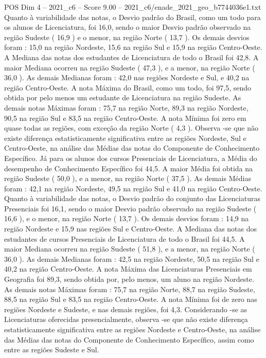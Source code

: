 \begin{textsample}{POS Dim 4 – 2021\_c6 – Score 9.00 – 2021\_c6/enade\_2021\_geo\_b7744036e1.txt}
Quanto à variabilidade das notas, o Desvio padrão do Brasil, como um todo para os alunos de Licenciatura, foi 16,0, sendo o maior Desvio padrão observado na região Sudeste ( 16,9 ) e o menor, na região Norte ( 13,7 ).
Os demais desvios foram : 15,0 na região Nordeste, 15,6 na região Sul e 15,9 na região Centro-Oeste.
A Mediana das notas dos estudantes de Licenciatura de todo o Brasil foi 42,8.
A maior Mediana ocorreu na região Sudeste ( 47,3 ), e a menor, na região Norte ( 36,0 ).
As demais Medianas foram : 42,0 nas regiões Nordeste e Sul, e 40,2 na região Centro-Oeste.
A nota Máxima do Brasil, como um todo, foi 97,5, sendo obtida por pelo menos um estudante de Licenciatura na região Sudeste.
As demais notas Máximas foram : 75,7 na região Norte, 89,3 na região Nordeste, 90,5 na região Sul e 83,5 na região Centro-Oeste.
A nota Mínima foi zero em quase todas as regiões, com exceção da região Norte ( 4,3 ).
Observa -se que não existe diferença estatisticamente significativa entre as regiões Nordeste, Sul e Centro-Oeste, na análise das Médias das notas do Componente de Conhecimento Específico.
Já para os alunos dos cursos Presenciais de Licenciatura, a Média do desempenho de Conhecimento Específico foi 44,5.
A maior Média foi obtida na região Sudeste ( 50,0 ), e a menor, na região Norte ( 37,5 ).
As demais Médias foram : 42,1 na região Nordeste, 49,5 na região Sul e 41,0 na região Centro-Oeste.
Quanto à variabilidade das notas, o Desvio padrão do conjunto das Licenciaturas Presenciais foi 16,1, sendo o maior Desvio padrão observado na região Sudeste ( 16,6 ), e o menor, na região Norte ( 13,7 ).
Os demais desvios foram : 14,9 na região Nordeste e 15,9 nas regiões Sul e Centro-Oeste.
A Mediana das notas dos estudantes de cursos Presenciais de Licenciatura de todo o Brasil foi 44,5.
A maior Mediana ocorreu na região Sudeste ( 51,8 ), e a menor, na região Norte ( 36,0 ).
As demais Medianas foram : 42,5 na região Nordeste, 50,5 na região Sul e 40,2 na região Centro-Oeste.
A nota Máxima das Licenciaturas Presenciais em Geografia foi 89,3, sendo obtida por, pelo menos, um aluno na região Nordeste.
As demais notas Máximas foram : 75,7 na região Norte, 88,7 na região Sudeste, 88,5 na região Sul e 83,5 na região Centro-Oeste.
A nota Mínima foi de zero nas regiões Nordeste e Sudeste, e nas demais regiões, foi 4,3.
Considerando -se as Licenciaturas oferecidas presencialmente, observa -se que não existe diferença estatisticamente significativa entre as regiões Nordeste e Centro-Oeste, na análise das Médias das notas do Componente de Conhecimento Específico, assim como entre as regiões Sudeste e Sul.

\end{textsample}
